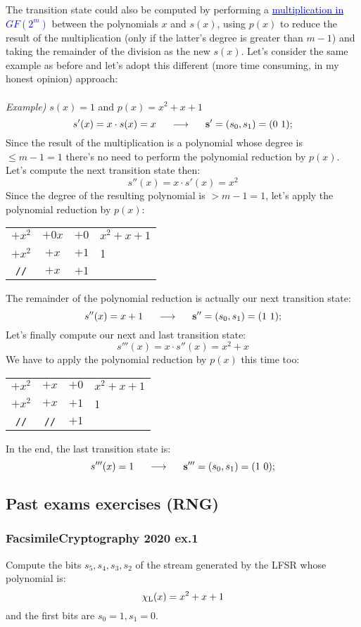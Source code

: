 \newpage\hfill\break
The transition state could also be computed by performing a \hyperlink{multGF}{\textcolor{blue}{multiplication in $GF(2^m)$}} between the polynomials $x$ and $s(x)$, using $p(x)$ to reduce the result of the multiplication (only if the latter's degree is greater than $m-1$) and taking the remainder of the division as the new $s(x)$. Let's consider the same example as before and let's adopt this different (more time consuming, in my honest opinion) approach:\\\\
\textit{Example)} $s(x)=1$ and $p(x)=x^2+x+1$
$$s'(x)=x\cdot s(x)=x\hspace{0.5cm}\longrightarrow\hspace{0.5cm} \textbf{s}'=(s_0,s_1)=(0\ 1);$$
Since the result of the multiplication is a polynomial whose degree is $\le m-1=1$ there's no need to perform the polynomial reduction by $p(x)$. Let's compute the next transition state then:
$$s''(x)=x\cdot s'(x)=x^2$$
Since the degree of the resulting polynomial is $>m-1=1$, let's apply the polynomial reduction by $p(x)$:
\begin{center}
    \begin{tabular}{ccc|l}
         $+x^2$&$+0x$&$+0$&$x^2+x+1$\\
         \cline{4-4}
         $+x^2$&$+x$&$+1$&1\\
         \cline{1-3}
         \texttt{//}&$+x$&$+1$&
    \end{tabular}
\end{center}
The remainder of the polynomial reduction is actually our next transition state:
$$s''(x)=x+1\consegue\textbf{s}''=(s_0,s_1)=(1\ 1);$$
Let's finally compute our next and last transition state:
$$s'''(x)=x\cdot s''(x)=x^2+x$$
We have to apply the polynomial reduction by $p(x)$ this time too:
\begin{center}
    \begin{tabular}{ccc|l}
         $+x^2$&$+x$&$+0$&$x^2+x+1$\\
         \cline{4-4}
         $+x^2$&$+x$&$+1$&1\\
         \cline{1-3}
         \texttt{//}&\texttt{//}&$+1$&
    \end{tabular}
\end{center}
In the end, the last transition state is:
$$s'''(x)=1\consegue \textbf{s}'''=(s_0,s_1)=(1\ 0);$$
\newpage
\subsection{Past exams exercises (RNG)}

\subsubsection{FacsimileCryptography 2020 ex.1}
Compute the bits $s_5,s_4,s_3,s_2$ of the stream generated by the LFSR whose polynomial is:
$$\chi_{\text L}(x)= x^2+x+1$$
and the first bits are $s_0=1, s_1=0$.
